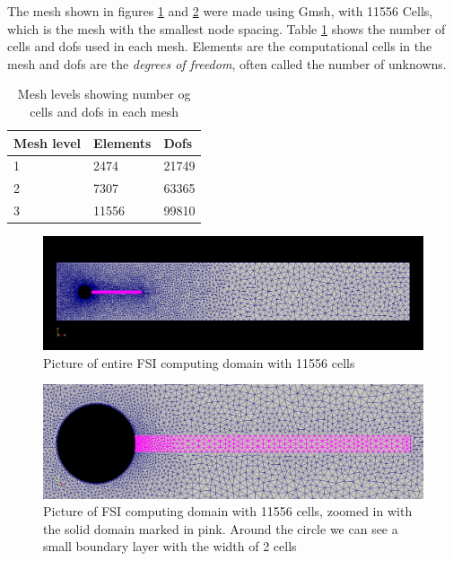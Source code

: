 The mesh shown in figures \ref{fig:fullmesh} and \ref{fig:partmesh} were made using Gmsh, with 11556 Cells, which is the mesh with the smallest node spacing. Table \ref{meshes} shows the number of cells and dofs used in each mesh. Elements are the computational cells in the mesh and dofs are the \textit{degrees of freedom}, often called the number of unknowns.

\begin{table}[H]
\centering
\label{meshes}
\begin{tabular}{|l|l|l|}
\hline
Mesh level & Elements & Dofs \\ \hline
1 & 2474 & 21749 \\ \hline
2 & 7307 & 63365 \\ \hline
3 & 11556 & 99810 \\ \hline
\end{tabular}
\caption{Mesh levels showing number og cells and dofs in each mesh}
\end{table}

\begin{figure}[H]
\centering
\includegraphics[scale=0.40,trim={20mm 34mm 20mm 30mm},clip]{./Verification_Validation/Hron_Turek/FSI_domain_b2.png}
\caption{Picture of entire FSI computing domain with 11556 cells}
\label{fig:fullmesh}
\end{figure}
\begin{figure}[H]
\centering
\includegraphics[scale=0.362,trim={0mm 0mm 0mm 0mm},clip]{./Verification_Validation/Hron_Turek/FSI_domain_b2_zoom.png}
\caption{Picture of FSI computing domain with 11556 cells, zoomed in with the solid domain marked in pink. Around the circle we can see a small boundary layer with the width of 2 cells}
\label{fig:partmesh}
\end{figure}



